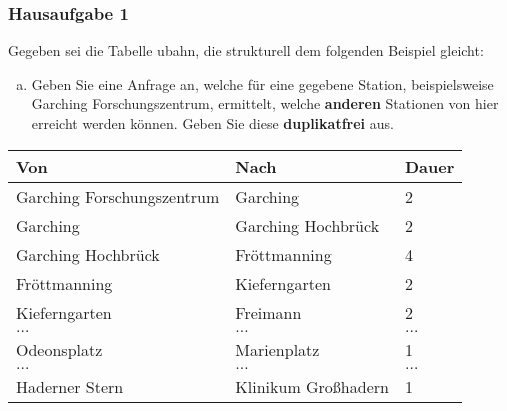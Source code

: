 \begin{frame}
\frametitle{Hausaufgabe 1}
\vspace{0.25cm}

\begin{multicols}{2}
	Gegeben sei die Tabelle ubahn, die strukturell dem folgenden Beispiel gleicht:
	\begin{enumerate}[a)]
		\item Geben Sie eine Anfrage an, welche für eine gegebene Station,
				beispielsweise Garching Forschungszentrum, ermittelt,
				welche \textbf{anderen} Stationen von hier erreicht werden können.
				Geben Sie diese \textbf{duplikatfrei} aus.


	\end{enumerate}
	\vfill\columnbreak

	\begin{table}[]
		\begin{tabular}{l|l|l}
			Von                        & Nach                & Dauer        \\ \hline
			Garching Forschungszentrum & Garching            & 2            \\
			Garching                   & Garching Hochbrück  & 2            \\
			Garching Hochbrück         & Fröttmanning        & 4            \\
			Fröttmanning               & Kieferngarten       & 2            \\
			Kieferngarten              & Freimann            & 2            \\
			\( \hdots \)               & \( \hdots \)        & \( \hdots \) \\
			Odeonsplatz                & Marienplatz         & 1            \\
			\( \hdots \)               & \( \hdots \)        & \( \hdots \) \\
			Haderner Stern             & Klinikum Großhadern & 1            \\
		\end{tabular}
	\end{table}
\end{multicols}
\end{frame}

